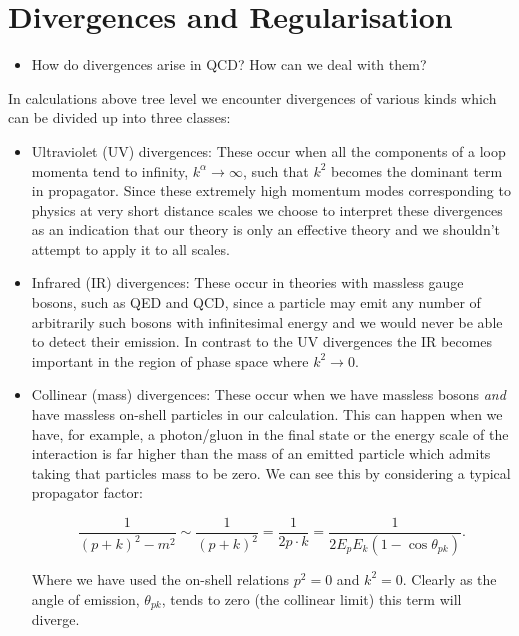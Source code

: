 \section{Divergences and Regularisation}

	{\color{red}
	\begin{itemize}
		\item How do divergences arise in QCD?  How can we deal with them?
	\end{itemize}
	}

	In calculations above tree level we encounter divergences of various kinds which can be divided up into three classes:

	\begin{itemize}
		\item Ultraviolet (UV) divergences:  These occur when all the components of a loop momenta tend to
		infinity, $k^\alpha\rightarrow\infty$, such that $k^2$ becomes the dominant term in propagator.
		Since these extremely high momentum modes corresponding to physics at very short distance scales
		we choose to interpret these divergences as an indication that our theory is only an
		effective theory and we shouldn't attempt to apply it to all scales.

		\item Infrared (IR) divergences:  These occur in theories with massless gauge bosons, such as
		QED and QCD, since a particle may emit any number of arbitrarily such bosons with infinitesimal
		energy and we would never be able to detect their emission.  In contrast to the UV divergences
		the IR becomes important in the region of phase space where $k^2\rightarrow0$.

		\item Collinear (mass) divergences: These occur when we have massless bosons \emph{and} have
		massless on-shell particles in our calculation.  This can happen when we have, for example,
		a photon/gluon in the final state or the energy scale of the interaction is far higher than
		the mass of an emitted particle which admits taking that particles mass to be zero.
		We can see this by considering a typical propagator factor:

		\begin{equation}
			\frac{1}{(p+k)^2-m^2}\sim\frac{1}{(p+k)^2} = \frac{1}{2p\cdot k} = \frac{1}{2E_pE_k(1-\cos\theta_{pk})}.
		\end{equation}

		Where we have used the on-shell relations $p^2=0$ and $k^2=0$.  Clearly as the angle of
		emission, $\theta_{pk}$, tends to zero (the collinear limit) this term will diverge.
	\end{itemize}

